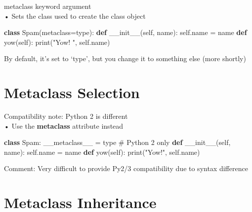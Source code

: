 \documentclass[
  letterpaper,
  DIV=11,
  numbers=noendperiod]{scrreprt}
\newenvironment{Shaded}{\begin{snugshade}}{\end{snugshade}}
\newcommand{\BuiltInTok}[1]{\textcolor[rgb]{0.00,0.23,0.31}{#1}}
\newcommand{\CommentTok}[1]{\textcolor[rgb]{0.37,0.37,0.37}{#1}}
\newcommand{\FunctionTok}[1]{\textcolor[rgb]{0.28,0.35,0.67}{#1}}
\newcommand{\KeywordTok}[1]{\textcolor[rgb]{0.00,0.23,0.31}{\textbf{#1}}}
\newcommand{\NormalTok}[1]{\textcolor[rgb]{0.00,0.23,0.31}{#1}}
\newcommand{\OperatorTok}[1]{\textcolor[rgb]{0.37,0.37,0.37}{#1}}
\newcommand{\StringTok}[1]{\textcolor[rgb]{0.13,0.47,0.30}{#1}}
\newcommand{\VariableTok}[1]{\textcolor[rgb]{0.07,0.07,0.07}{#1}}
\begin{document}
metaclass keyword argument\\
• Sets the class used to create the class object

\begin{Shaded}
\begin{Highlighting}[]
\KeywordTok{class}\NormalTok{ Spam(metaclass}\OperatorTok{=}\BuiltInTok{type}\NormalTok{): }\KeywordTok{def} \FunctionTok{\_\_init\_\_}\NormalTok{(}\VariableTok{self}\NormalTok{, name): }\VariableTok{self}\NormalTok{.name }\OperatorTok{=}\NormalTok{ name }\KeywordTok{def}\NormalTok{ yow(}\VariableTok{self}\NormalTok{): }\BuiltInTok{print}\NormalTok{(}\StringTok{"Yow! "}\NormalTok{, }\VariableTok{self}\NormalTok{.name) }
\end{Highlighting}
\end{Shaded}

By default, it's set to `type', but you change it to something else
(more shortly)


\chapter{Metaclass Selection}\label{metaclass-selection-1}

Compatibility note: Python 2 is different\\
• Use the \textbf{metaclass} attribute instead

\begin{Shaded}
\begin{Highlighting}[]
\KeywordTok{class}\NormalTok{ Spam: \_\_metaclass\_\_ }\OperatorTok{=} \BuiltInTok{type} \CommentTok{\# Python 2 only}
\KeywordTok{def} \FunctionTok{\_\_init\_\_}\NormalTok{(}\VariableTok{self}\NormalTok{, name):}
    \VariableTok{self}\NormalTok{.name }\OperatorTok{=}\NormalTok{ name}
\KeywordTok{def}\NormalTok{ yow(}\VariableTok{self}\NormalTok{):}
    \BuiltInTok{print}\NormalTok{(}\StringTok{"Yow!"}\NormalTok{, }\VariableTok{self}\NormalTok{.name) }
\end{Highlighting}
\end{Shaded}

Comment: Very difficult to provide Py2/3 compatibility due to syntax
difference


\chapter{Metaclass Inheritance}\label{metaclass-inheritance}
\end{document}
